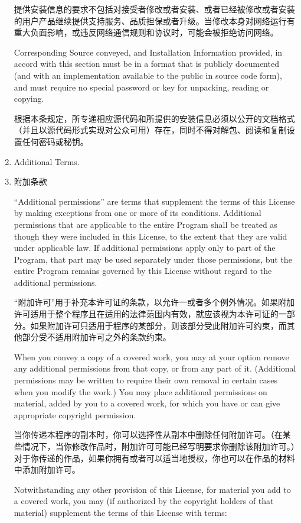 \documentclass[11pt]{article}
\begin{document}
\begin{enumerate}
提供安装信息的要求不包括对接受者修改或者安装、或者已经被修改或者安装的用户产品继续提供支持服务、品质担保或者升级。当修改本身对网络运行有重大负面影响，或违反网络通信规则和协议时，可能会被拒绝访问网络。

Corresponding Source conveyed, and Installation Information provided,
in accord with this section must be in a format that is publicly
documented (and with an implementation available to the public in
source code form), and must require no special password or key for
unpacking, reading or copying.

根据本条规定，所专递相应源代码和所提供的安装信息必须以公开的文档格式（并且以源代码形式实现对公众可用）存在，同时不得对解包、阅读和复制设置任何密码或秘钥。

\item Additional Terms.
\item 附加条款

``Additional permissions'' are terms that supplement the terms of this
License by making exceptions from one or more of its conditions.
Additional permissions that are applicable to the entire Program shall
be treated as though they were included in this License, to the extent
that they are valid under applicable law.  If additional permissions
apply only to part of the Program, that part may be used separately
under those permissions, but the entire Program remains governed by
this License without regard to the additional permissions.

“附加许可”用于补充本许可证的条款，以允许一或者多个例外情况。如果附加许可适用于整个程序且在适用的法律范围内有效，就应该视为本许可证的一部分。如果附加许可只适用于程序的某部分，则该部分受此附加许可约束，而其他部分受不适用附加许可之外的条款约束。

When you convey a copy of a covered work, you may at your option
remove any additional permissions from that copy, or from any part of
it.  (Additional permissions may be written to require their own
removal in certain cases when you modify the work.)  You may place
additional permissions on material, added by you to a covered work,
for which you have or can give appropriate copyright permission.

当你传递本程序的副本时，你可以选择性从副本中删除任何附加许可。（在某些情况下，当你修改作品时，附加许可可能已经写明要求你删除该附加许可。）对于你传递的作品，如果你拥有或者可以适当地授权，你也可以在作品的材料中添加附加许可。

Notwithstanding any other provision of this License, for material you
add to a covered work, you may (if authorized by the copyright holders of
that material) supplement the terms of this License with terms:


\end{enumerate}
\end{document}
